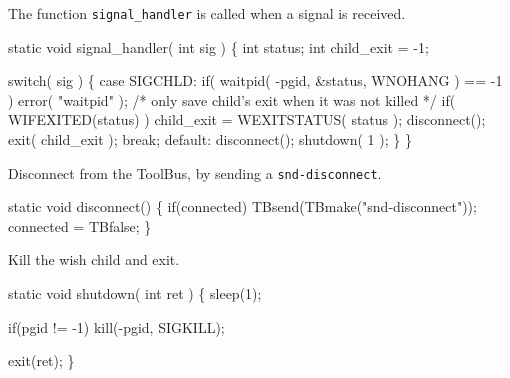The function {\tt signal\_handler} is called when a signal is
received.

\nwenddocs{}\endmoddef\let\nwnotused=\nwoutput{}\nwstartdeflinemarkup{}\nwenddeflinemarkup
static void signal_handler( int sig )
\{
   int status;
   int child_exit = -1;

   switch( sig )
   \{
      case SIGCHLD:
         if( waitpid( -pgid, &status, WNOHANG ) == -1 )
            error( "waitpid" );
         /* only save child's exit when it was not killed */
         if( WIFEXITED(status) )
            child_exit = WEXITSTATUS( status );
         disconnect();
         exit( child_exit );
         break;
      default:
         disconnect();
         shutdown( 1 );
   \}
\}
\nwendcode{}\nwdocspar


Disconnect from the ToolBus, by sending a {\tt snd-disconnect}.

\nwenddocs{}\endmoddef\let\nwnotused=\nwoutput{}\nwstartdeflinemarkup{}\nwenddeflinemarkup
static void disconnect()
\{
   if(connected)
      TBsend(TBmake("snd-disconnect"));
   connected = TBfalse;
\}
\nwendcode{}\nwdocspar


Kill the wish child and exit.

\nwenddocs{}\endmoddef\let\nwnotused=\nwoutput{}\nwstartdeflinemarkup{}\nwenddeflinemarkup
static void shutdown( int ret )
\{
   sleep(1);
   
   if(pgid != -1)
      kill(-pgid, SIGKILL);
   
   exit(ret);
\}
\nwendcode{}\nwdocspar

